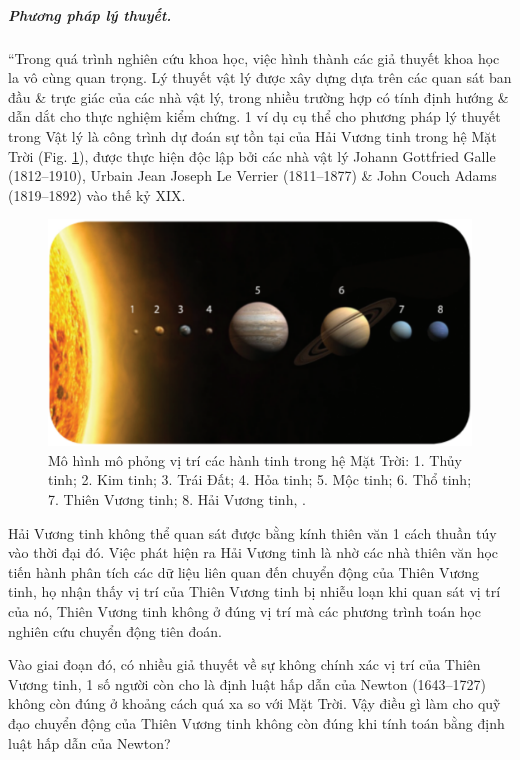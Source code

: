 \documentclass{article}
\numberwithin{equation}{section}
\begin{document}
\subparagraph{Phương pháp lý thuyết.} ``Trong quá trình nghiên cứu khoa học, việc hình thành các giả thuyết khoa học la vô cùng quan trọng. Lý thuyết vật lý được xây dựng dựa trên các quan sát ban đầu \& trực giác của các nhà vật lý, trong nhiều trường hợp có tính định hướng \& dẫn dắt cho thực nghiệm kiểm chứng. 1 ví dụ cụ thể cho phương pháp lý thuyết trong Vật lý là công trình dự đoán sự tồn tại của Hải Vương tinh trong hệ Mặt Trời (Fig. \ref{fig:cac hanh tinh trong he Mat Troi}), được thực hiện độc lập bởi các nhà vật lý Johann Gottfried Galle (1812--1910), Urbain Jean Joseph Le Verrier (1811--1877) \& John Couch Adams (1819--1892) vào thế kỷ XIX.

\begin{figure}[H]
	\centering
	\includegraphics[scale=0.2]{cac_hanh_tinh_trong_he_Mat_Troi}
	\caption{Mô hình mô phỏng vị trí các hành tinh trong hệ Mặt Trời: 1. Thủy tinh; 2. Kim tinh; 3. Trái Đất; 4. Hỏa tinh; 5. Mộc tinh; 6. Thổ tinh; 7. Thiên Vương tinh; 8. Hải Vương tinh, \cite[Hình 1.4, p. 7]{SGK_Vat_Ly_10_Chan_Troi_Sang_Tao}.}
	\label{fig:cac hanh tinh trong he Mat Troi}
\end{figure}
Hải Vương tinh không thể quan sát được bằng kính thiên văn 1 cách thuần túy vào thời đại đó. Việc phát hiện ra Hải Vương tinh là nhờ các nhà thiên văn học tiến hành phân tích các dữ liệu liên quan đến chuyển động của Thiên Vương tinh, họ nhận thấy vị trí của Thiên Vương tinh bị nhiễu loạn khi quan sát vị trí của nó, Thiên Vương tinh không ở đúng vị trí mà các phương trình toán học nghiên cứu chuyển động tiên đoán.

Vào giai đoạn đó, có nhiều giả thuyết về sự không chính xác vị trí của Thiên Vương tinh, 1 số người còn cho là định luật hấp dẫn của Newton (1643--1727) không còn đúng ở khoảng cách quá xa so với Mặt Trời. Vậy điều gì làm cho quỹ đạo chuyển động của Thiên Vương tinh không còn đúng khi tính toán bằng định luật hấp dẫn của Newton?
\end{document}
